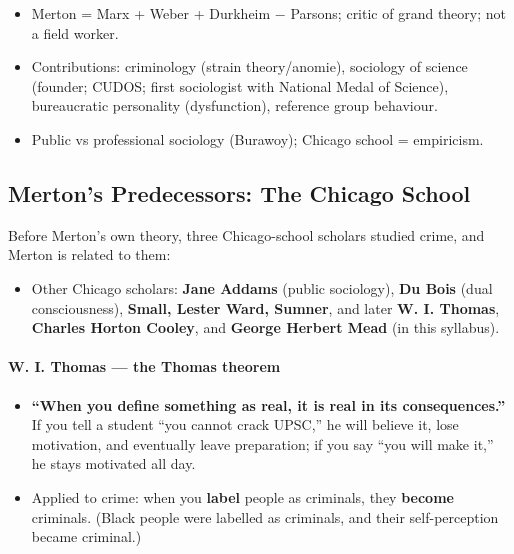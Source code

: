 \begin{QuickRevision}
\begin{itemize}
\item Merton = Marx + Weber + Durkheim $-$ Parsons; critic of grand theory; not a field worker.
\item Contributions: criminology (strain theory/anomie), sociology of science (founder; CUDOS; first sociologist with National Medal of Science), bureaucratic personality (dysfunction), reference group behaviour.
\item Public vs professional sociology (Burawoy); Chicago school = empiricism.
\end{itemize}
\end{QuickRevision}

\sectiondivider

\subsection{Merton's Predecessors: The Chicago School}

Before Merton's own theory, three Chicago-school scholars studied crime, and Merton is related to them:

\begin{DataFact}
\begin{itemize}
\item Other Chicago scholars: \textbf{Jane Addams} (public sociology), \textbf{Du Bois} (dual consciousness), \textbf{Small, Lester Ward, Sumner}, and later \textbf{W. I. Thomas}, \textbf{Charles Horton Cooley}, and \textbf{George Herbert Mead} (in this syllabus).
\end{itemize}
\end{DataFact}

\paragraph{W. I. Thomas --- the Thomas theorem}

\begin{KeyConcept}
\begin{itemize}
\item \textbf{``When you define something as real, it is real in its consequences.''} If you tell a student ``you cannot crack UPSC,'' he will believe it, lose motivation, and eventually leave preparation; if you say ``you will make it,'' he stays motivated all day.
\item Applied to crime: when you \textbf{label} people as criminals, they \textbf{become} criminals. (Black people were labelled as criminals, and their self-perception became criminal.)
\end{itemize}
\end{KeyConcept}

